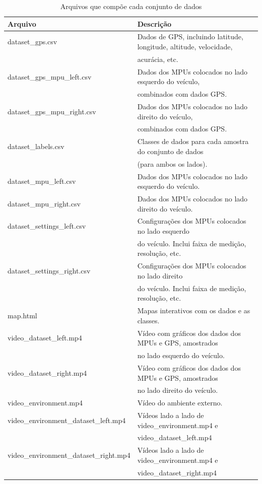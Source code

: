 
\begin{table}[H]
\scriptsize
\caption{Arquivos que compõe cada conjunto de dados} 
\label{table:conjuntos_arquivos}
\centering
\begin{tabular}{ll}
\toprule
\textbf{Arquivo} & \textbf{Descrição} \\ \midrule
dataset\_gps.csv & Dados de GPS, incluindo latitude, longitude, altitude, velocidade, \\ & acurácia, etc. \\ \midrule
dataset\_gps\_mpu\_left.csv & Dados dos MPUs colocados no lado esquerdo do veículo, \\ & combinados com dados GPS. \\ \midrule
dataset\_gps\_mpu\_right.csv & Dados dos MPUs colocados no lado direito do veículo, \\ & combinados com dados GPS. \\ \midrule
dataset\_labels.csv & Classes de dados para cada amostra do conjunto de dados \\ & (para ambos os lados). \\ \midrule
dataset\_mpu\_left.csv & Dados dos MPUs colocados no lado esquerdo do veículo. \\ \midrule
dataset\_mpu\_right.csv & Dados dos MPUs colocados no lado direito do veículo. \\ \midrule
dataset\_settings\_left.csv & Configurações dos MPUs colocados no lado esquerdo \\ & do veículo. Inclui faixa de medição, resolução, etc. \\ \midrule
dataset\_settings\_right.csv & Configurações dos MPUs colocados no lado direito \\ & do veículo. Inclui faixa de medição, resolução, etc. \\ \midrule
map.html & Mapas interativos com os dados e as classes. \\ \midrule
video\_dataset\_left.mp4 & Vídeo com gráficos dos dados dos MPUs e GPS, amostrados \\ & no lado esquerdo do veículo. \\ \midrule
video\_dataset\_right.mp4 & Vídeo com gráficos dos dados dos MPUs e GPS, amostrados \\ & no lado direito do veículo. \\ \midrule
video\_environment.mp4 & Vídeo do ambiente externo. \\ \midrule
video\_environment\_dataset\_left.mp4 & Vídeos lado a lado de video\_environment.mp4 e \\ & video\_dataset\_left.mp4 \\ \midrule
video\_environment\_dataset\_right.mp4 & Vídeos lado a lado de video\_environment.mp4 e \\ & video\_dataset\_right.mp4 \\ \bottomrule
\end{tabular}
\end{table}

